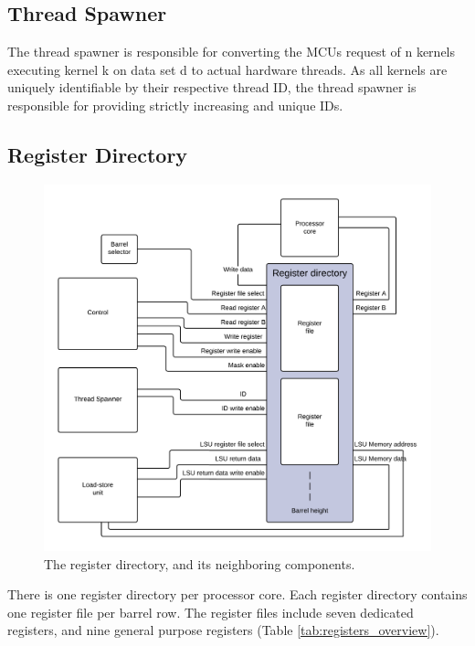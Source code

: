 \documentclass[../main/report.tex]{subfiles}
\begin{document}
\subsection{Thread Spawner}

The thread spawner is responsible for converting the MCUs request of n kernels executing kernel k on data set d to actual hardware threads.
As all kernels are uniquely identifiable by their respective thread ID, the thread spawner is responsible for providing strictly increasing and unique IDs.


\subsection{Register Directory}
\begin{figure}[H]
	\centering
	\includegraphics[width=\textwidth]{../gpu/diagrams/register_directory.png}
	\caption{The register directory, and its neighboring components.}
	\label{fig:register_directory}
\end{figure}

There is one register directory per processor core.
Each register directory contains one register file per barrel row.
The register files include seven dedicated registers, and nine general purpose registers (Table \ref{tab:registers_overview}).
\end{document}
